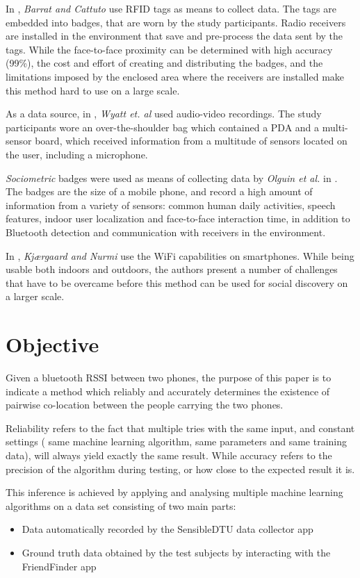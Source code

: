 In \cite{catt}, \textit{Barrat and Cattuto} use RFID tags as means to collect data. The tags are embedded into badges, that are worn by the study participants. Radio receivers are installed in the environment that save and pre-process the data sent by the tags. While the face-to-face proximity can be determined with high accuracy (99\%), the cost and effort of creating and distributing the badges, and the limitations imposed by the enclosed area where the receivers are installed make this method hard to use on a large scale.

As a data source, in \cite{audiovideo}, \textit{Wyatt et. al} used audio-video recordings. The study participants wore an over-the-shoulder bag which contained a PDA and a multi-sensor board, which received information from a multitude of sensors located on the user, including a microphone.

\textit{Sociometric} badges were used as means of collecting data by \textit{Olguin et al.} in \cite{onbody}. The badges are the size of a mobile phone, and record a high amount of information from a variety of sensors: common human daily activities, speech features, indoor user localization and face-to-face interaction time, in addition to Bluetooth detection and communication with receivers in the environment.

In \cite{wifi}, \textit{ Kjærgaard and Nurmi} use the WiFi capabilities on smartphones. While being usable both indoors and outdoors, the authors present a number of challenges that have to be overcame before this method can be used for social discovery on a larger scale.   
 
\section{Objective}

Given a bluetooth RSSI between two phones, the purpose of this paper is to indicate a method which reliably and accurately determines the existence of pairwise co-location between the people carrying the two phones.

Reliability refers to the fact that multiple tries with the same input, and constant settings ( same machine learning algorithm, same parameters and same training data), will always yield exactly the same result. While accuracy refers to the precision of the algorithm during testing, or how close to the expected result it is. 
 
This inference is achieved by applying and analysing multiple machine learning algorithms on a data set consisting of two main parts:
\begin{itemize}
  \item Data automatically recorded by the SensibleDTU data collector app \cite{Stopczynski}
  \item Ground truth data obtained by the test subjects by interacting with the FriendFinder app
\end{itemize}

